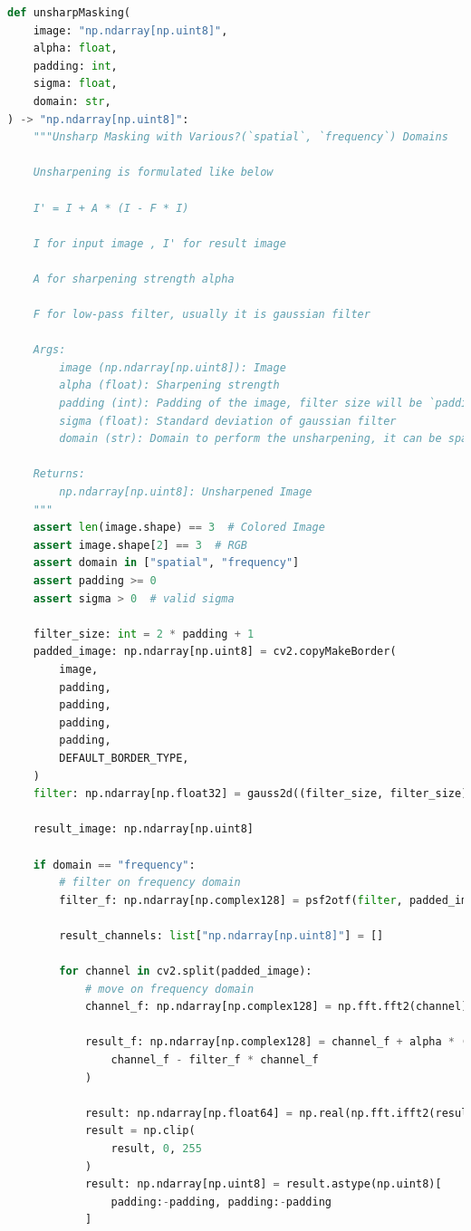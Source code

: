\documentclass{report}
\begin{document}
\begin{lstlisting}[language=Python, caption=unsharpMasking, firstnumber=282]
def unsharpMasking(
    image: "np.ndarray[np.uint8]",
    alpha: float,
    padding: int,
    sigma: float,
    domain: str,
) -> "np.ndarray[np.uint8]":
    """Unsharp Masking with Various?(`spatial`, `frequency`) Domains

    Unsharpening is formulated like below

    I' = I + A * (I - F * I)

    I for input image , I' for result image
    
    A for sharpening strength alpha
    
    F for low-pass filter, usually it is gaussian filter

    Args:
        image (np.ndarray[np.uint8]): Image
        alpha (float): Sharpening strength
        padding (int): Padding of the image, filter size will be `padding * 2 + 1`
        sigma (float): Standard deviation of gaussian filter
        domain (str): Domain to perform the unsharpening, it can be spatial or frequency

    Returns:
        np.ndarray[np.uint8]: Unsharpened Image
    """
    assert len(image.shape) == 3  # Colored Image
    assert image.shape[2] == 3  # RGB
    assert domain in ["spatial", "frequency"]
    assert padding >= 0
    assert sigma > 0  # valid sigma

    filter_size: int = 2 * padding + 1
    padded_image: np.ndarray[np.uint8] = cv2.copyMakeBorder(
        image,
        padding,
        padding,
        padding,
        padding,
        DEFAULT_BORDER_TYPE,
    )
    filter: np.ndarray[np.float32] = gauss2d((filter_size, filter_size), sigma)

    result_image: np.ndarray[np.uint8]

    if domain == "frequency":
        # filter on frequency domain
        filter_f: np.ndarray[np.complex128] = psf2otf(filter, padded_image.shape[:2])

        result_channels: list["np.ndarray[np.uint8]"] = []

        for channel in cv2.split(padded_image):
            # move on frequency domain
            channel_f: np.ndarray[np.complex128] = np.fft.fft2(channel)

            result_f: np.ndarray[np.complex128] = channel_f + alpha * (
                channel_f - filter_f * channel_f
            )

            result: np.ndarray[np.float64] = np.real(np.fft.ifft2(result_f))
            result = np.clip(
                result, 0, 255
            )
            result: np.ndarray[np.uint8] = result.astype(np.uint8)[
                padding:-padding, padding:-padding
            ]


\end{lstlisting}
\end{document}
